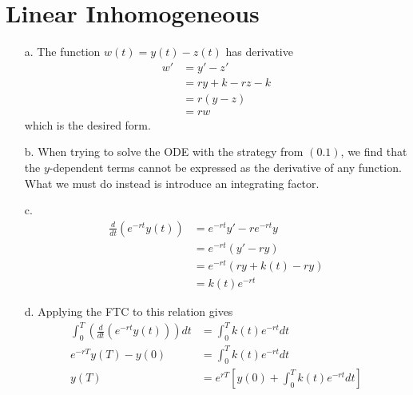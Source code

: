 \documentclass{article}
\begin{document}
\section{Linear Inhomogeneous}
\begin{enumerate}
	\item[a.]
		The function $w(t) = y(t) - z(t)$ has derivative
	 	\begin{align*}
			 w' &= y' - z' \\
			    &= ry + k - rz - k \\
			    &= r(y-z) \\
			    &= rw
		\end{align*}
		which is the desired form.
	
	\item[b.]
		When trying to solve the ODE with the strategy from $(0.1)$, we find that the $y$-dependent terms cannot be expressed as the derivative of any function. What we must do instead is introduce an integrating factor.

	\item[c.]
		\begin{align*}
			\frac{d }{d t} (e^{-rt} y(t)) &= e^{-rt} y' - r e^{-rt} y \\
						      &= e^{-rt} (y' - ry) \\
						      &= e^{-rt} (ry + k(t) - ry) \\
						      &= k(t) e^{-rt}
		\end{align*}
	
	\item[d.]
		Applying the FTC to this relation gives
		\begin{align*}
			\int_{0}^{T} \left( \frac{d }{d t} (e^{-rt} y(t)) \right) dt &= \int_{0}^{T} k(t) e^{-rt} dt \\
			e^{-rT} y(T) - y(0) &= \int_{0}^{T} k(t) e^{-rt} dt \\
			y(T) &= e^{rT} \left[ y(0) + \int_{0}^{T} k(t) e^{-rt} dt \right]
		\end{align*}
\end{enumerate}
\end{document}
